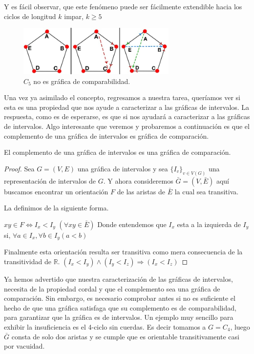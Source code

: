 Y es fácil observar, que este fenómeno puede ser fácilmente extendible hacia los ciclos de longitud $k$ impar, $k\geq 5$

\begin{figure}[H]
  \centering
  \includegraphics[width=0.7\textwidth]{recursos/capturas/207.jpg}
  \caption{$C_5$ no es gráfica de comparabilidad.}
  \label{fig:207}
\end{figure}

Una vez ya asimilado el concepto, regresamos a nuestra tarea, queríamos ver si esta es una propiedad que nos ayude a caracterizar a las gráficas de intervalos. La respuesta, como es de esperarse, es que si nos ayudará a caracterizar a las gráficas de intervalos.
Algo interesante que veremos y probaremos a continuación es que el complemento de una gráfica de intervalos es gráfica de comparación.

\begin{teorema}
    \label{teo:Int-Comprbldd}
    El complemento de una gráfica de intervalos es una gráfica de comparación.
\end{teorema}

\begin{proof}
    Sea $G=(V,E)$ una gráfica de intervalos y sea $\{I_v \}_{v\in V(G)}$ una representación de intervalos de $G$. Y ahora consideremos $ \bar{G} =(V, \bar{E})$ aquí buscamos encontrar un orientación $F$ de las aristas de $\bar{E}$ la cual sea transitiva.
    
    La definimos de la siguiente forma.
    
    $xy\in F \iff I_x<I_y$ $(\forall xy\in \bar{E})$
    Donde entendemos que $I_x$ esta a la izquierda de $I_y$ si,
    $\forall a\in I_x, \forall b \in I_y(a<b)$

    Finalmente esta orientación resulta ser transitiva como mera consecuencia de la transitividad de $\mathbb{R}$.
    $(I_x < I_y) \wedge (I_y < I_z) \Rightarrow (I_x<I_z) $
\end{proof}

Ya hemos advertido que nuestra caracterización de las gráficas de intervalos, necesita de la propiedad cordal y que el complemento sea una gráfica de comparación. Sin embargo, es necesario comprobar antes si no es suficiente el hecho de que una gráfica satisfaga que su complemento es de comparabilidad, para garantizar que la gráfica es de intervalos. Un ejemplo muy sencillo para exhibir la insuficiencia es el 4-ciclo sin cuerdas. Es decir tomamos a $G=C_4$, luego $\bar{G}$ consta de solo dos aristas y se cumple que es orientable transitivamente casi por vacuidad.

